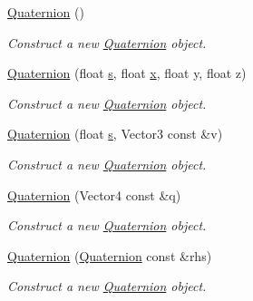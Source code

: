 \begin{DoxyCompactItemize}
\item 
\mbox{\label{structMathUtil_1_1Quaternion_a907569c1017c9d6f3448e3ab1e5216e6}} 
\hyperlink{structMathUtil_1_1Quaternion_a907569c1017c9d6f3448e3ab1e5216e6}{Quaternion} ()
\begin{DoxyCompactList}\small\item\em Construct a new \hyperlink{structMathUtil_1_1Quaternion}{Quaternion} object. \end{DoxyCompactList}\item 
\hyperlink{structMathUtil_1_1Quaternion_a3142498176c3a32c1fca7d257ec68cb1}{Quaternion} (float \hyperlink{structMathUtil_1_1Quaternion_ab31b359cfe29936ec4572e83aee9c9d4}{s}, float \hyperlink{structMathUtil_1_1Quaternion_a81f714a042bf08434cfddf71ae83ff6b}{x}, float y, float z)
\begin{DoxyCompactList}\small\item\em Construct a new \hyperlink{structMathUtil_1_1Quaternion}{Quaternion} object. \end{DoxyCompactList}\item 
\hyperlink{structMathUtil_1_1Quaternion_a37a9999111f098a39f745ef55df73573}{Quaternion} (float \hyperlink{structMathUtil_1_1Quaternion_ab31b359cfe29936ec4572e83aee9c9d4}{s}, Vector3 const \&v)
\begin{DoxyCompactList}\small\item\em Construct a new \hyperlink{structMathUtil_1_1Quaternion}{Quaternion} object. \end{DoxyCompactList}\item 
\hyperlink{structMathUtil_1_1Quaternion_a37216d9a4beb2dbe5a077aeba11bfca2}{Quaternion} (Vector4 const \&q)
\begin{DoxyCompactList}\small\item\em Construct a new \hyperlink{structMathUtil_1_1Quaternion}{Quaternion} object. \end{DoxyCompactList}\item 
\hyperlink{structMathUtil_1_1Quaternion_ab8a51bd860dc7c4d007aa0b87861c948}{Quaternion} (\hyperlink{structMathUtil_1_1Quaternion}{Quaternion} const \&rhs)
\begin{DoxyCompactList}\small\item\em Construct a new \hyperlink{structMathUtil_1_1Quaternion}{Quaternion} object. \end{DoxyCompactList}\item 

\end{DoxyCompactItemize}
